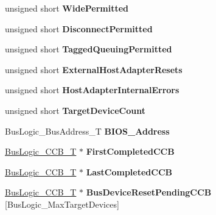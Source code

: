 \begin{DoxyCompactItemize}
unsigned short {\bfseries Wide\+Permitted}
\item 
\mbox{\label{struct_bus_logic___host_adapter_a31848826ac83c931634b38a857094234}} 
unsigned short {\bfseries Disconnect\+Permitted}
\item 
\mbox{\label{struct_bus_logic___host_adapter_a0aa08146ba5235f2ac419d2107fac6ab}} 
unsigned short {\bfseries Tagged\+Queuing\+Permitted}
\item 
\mbox{\label{struct_bus_logic___host_adapter_a122662102ddc46494e5095c6b8e5a18e}} 
unsigned short {\bfseries External\+Host\+Adapter\+Resets}
\item 
\mbox{\label{struct_bus_logic___host_adapter_a283bf1c3dcfa89eea1f956d787caface}} 
unsigned short {\bfseries Host\+Adapter\+Internal\+Errors}
\item 
\mbox{\label{struct_bus_logic___host_adapter_a51a00bb462aa58e082f2ef5adb30e736}} 
unsigned short {\bfseries Target\+Device\+Count}
\item 
\mbox{\label{struct_bus_logic___host_adapter_aa848d1ccb7058196980c2e6f2e174ac2}} 
Bus\+Logic\+\_\+\+Bus\+Address\+\_\+T {\bfseries B\+I\+O\+S\+\_\+\+Address}
\item 
\mbox{\label{struct_bus_logic___host_adapter_a8254df9374f9afa0868ffd6cd0b6ae47}} 
\hyperlink{struct_bus_logic___c_c_b}{Bus\+Logic\+\_\+\+C\+C\+B\+\_\+T} $\ast$ {\bfseries First\+Completed\+C\+CB}
\item 
\mbox{\label{struct_bus_logic___host_adapter_ad873d5050ac1b5c632d65c611f76d8b5}} 
\hyperlink{struct_bus_logic___c_c_b}{Bus\+Logic\+\_\+\+C\+C\+B\+\_\+T} $\ast$ {\bfseries Last\+Completed\+C\+CB}
\item 
\mbox{\label{struct_bus_logic___host_adapter_a283f0eb66bc0f02d02b190f33133a2b1}} 
\hyperlink{struct_bus_logic___c_c_b}{Bus\+Logic\+\_\+\+C\+C\+B\+\_\+T} $\ast$ {\bfseries Bus\+Device\+Reset\+Pending\+C\+CB} \mbox{[}Bus\+Logic\+\_\+\+Max\+Target\+Devices\mbox{]}

\end{DoxyCompactItemize}
